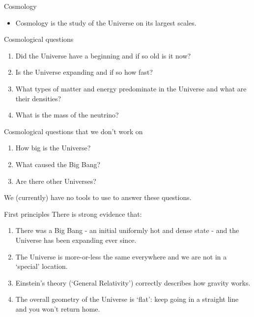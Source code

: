 \documentclass[usenames,dvipsnames]{beamer}
\begin{document}
\begin{frame}{Cosmology}
  \begin{block}{}
    \begin{itemize}
      \item{Cosmology is the study of the Universe on its largest scales.}
    \end{itemize}
  \end{block}
\end{frame}

\begin{frame}{Cosmological questions}
  \begin{block}{}
    \begin{enumerate}
      \item{Did the Universe have a beginning and if so old is it now?}
      \item{Is the Universe expanding and if so how fast?}
      \item{What types of matter and energy predominate in the Universe and what are their densities?}
      \item{What is the mass of the neutrino?}
    \end{enumerate}
  \end{block}
\end{frame}

\begin{frame}{Cosmological questions that we don't work on}
  \begin{block}{}
    \begin{enumerate}
      \item{How big is the Universe?}
      \item{What caused the Big Bang?}
      \item{Are there other Universes?}
    \end{enumerate}
    We (currently) have no tools to use to answer these questions.
  \end{block}
\end{frame}


\begin{frame}{First principles}
  There is strong evidence that:
  \begin{block}{}
    \begin{enumerate}
      \item{There was a Big Bang - an initial uniformly hot and dense state - and the Universe has been expanding ever since.}
      \item{The Universe is more-or-less the same everywhere and we are not in a `special' location.}
      \item{Einstein's theory (`General Relativity') correctly describes how gravity works.}
      \item{The overall geometry of the Universe is `flat': keep going in a straight line and you won't return home.}
    \end{enumerate}
  \end{block}
\end{frame}
\end{document}
